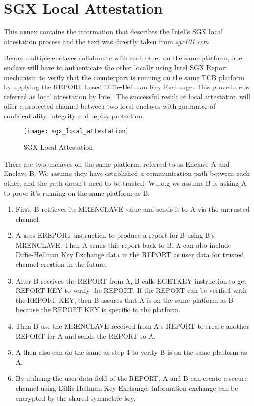 \chapter{SGX Local Attestation}
\label{ann:sgx_local_attestation}

This annex contains the information that describes the Intel's \gls{SGX} local attestation process and the text was directly taken from \textit{sgx101.com} \cite{sgx:localAttestation}.

Before multiple enclaves collaborate with each other on the same platform, one enclave will have to authenticate the other locally using Intel SGX Report mechanism to verify that the counterpart is running on the same TCB platform by applying the REPORT based Diffie-Hellman Key Exchange. This procedure is referred as local attestation by Intel. The successful result of local attestation will offer a protected channel between two local enclaves with guarantee of confidentiality, integrity and replay protection.

\begin{figure}[htbp]
	\centerline{\texttt{[image: sgx\_local\_attestation]}}%
	\caption{SGX Local Attestation}
	\label{fig:sgx_local_attestation}
\end{figure}

There are two enclaves on the same platform, referred to as Enclave A and Enclave B. We assume they have established a communication path between each other, and the path doesn’t need to be trusted. W.l.o.g we assume B is asking A to prove it’s running on the same platform as B.

\begin{enumerate}
	\item First, B retrieves its MRENCLAVE value and sends it to A via the untrusted channel.
	\item A uses EREPORT instruction to produce a report for B using B’s MRENCLAVE. Then A sends this report back to B. A can also include Diffie-Hellman Key Exchange data in the REPORT as user data for trusted channel creation in the future.
	\item After B receives the REPORT from A, B calls EGETKEY instruction to get REPORT KEY to verify the REPORT. If the REPORT can be verified with the REPORT KEY, then B assures that A is on the same platform as B because the REPORT KEY is specific to the platform.
	\item Then B use the MRENCLAVE received from A’s REPORT to create another REPORT for A and sends the REPORT to A.
	\item A then also can do the same as step 4 to verity B is on the same platform as A.
	\item By utilising the user data field of the REPORT, A and B can create a secure channel using Diffie-Hellman Key Exchange. Information exchange can be encrypted by the shared symmetric key.
\end{enumerate}